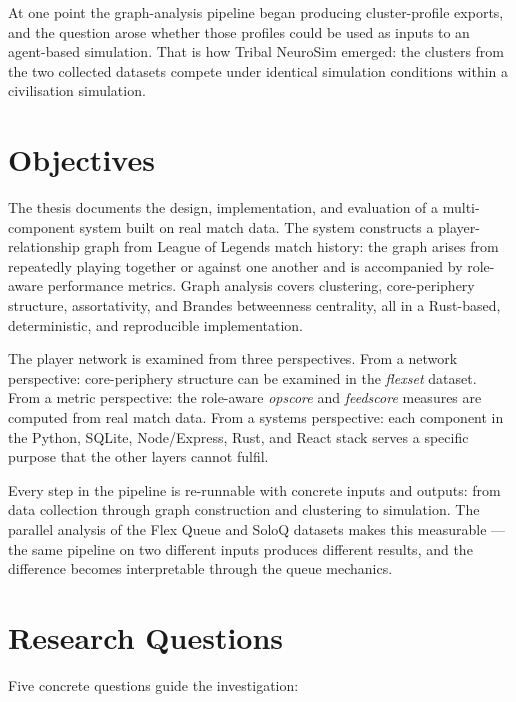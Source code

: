 At one point the graph-analysis pipeline began producing cluster-profile exports, and the question arose whether those profiles could be used as inputs to an agent-based simulation. That is how Tribal NeuroSim emerged: the clusters from the two collected datasets compete under identical simulation conditions within a civilisation simulation.

\section{Objectives}

The thesis documents the design, implementation, and evaluation of a multi-component system built on real match data. The system constructs a player-relationship graph from League of Legends match history: the graph arises from repeatedly playing together or against one another and is accompanied by role-aware performance metrics. Graph analysis covers clustering, core-periphery structure, assortativity, and Brandes betweenness centrality, all in a Rust-based, deterministic, and reproducible implementation.

The player network is examined from three perspectives. From a network perspective: core-periphery structure can be examined in the \textit{flexset} dataset. From a metric perspective: the role-aware \textit{opscore} and \textit{feedscore} measures are computed from real match data. From a systems perspective: each component in the Python, SQLite, Node/Express, Rust, and React stack serves a specific purpose that the other layers cannot fulfil.

Every step in the pipeline is re-runnable with concrete inputs and outputs: from data collection through graph construction and clustering to simulation. The parallel analysis of the Flex Queue and SoloQ datasets makes this measurable --- the same pipeline on two different inputs produces different results, and the difference becomes interpretable through the queue mechanics.

\section{Research Questions}

Five concrete questions guide the investigation:


